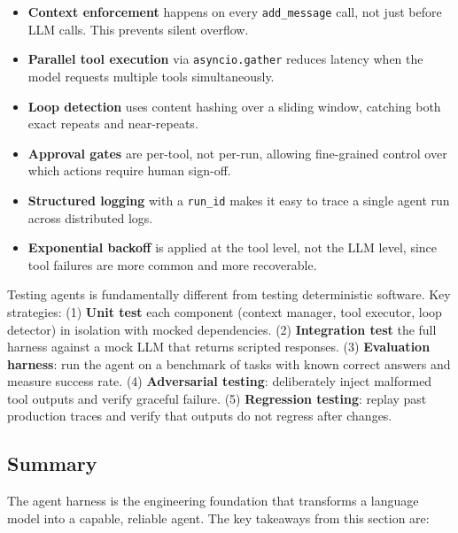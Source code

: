 \begin{examplebox}
\begin{itemize}
  \item \textbf{Context enforcement} happens on every \texttt{add\_message} call, not just before LLM calls. This prevents silent overflow.
  \item \textbf{Parallel tool execution} via \texttt{asyncio.gather} reduces latency when the model requests multiple tools simultaneously.
  \item \textbf{Loop detection} uses content hashing over a sliding window, catching both exact repeats and near-repeats.
  \item \textbf{Approval gates} are per-tool, not per-run, allowing fine-grained control over which actions require human sign-off.
  \item \textbf{Structured logging} with a \texttt{run\_id} makes it easy to trace a single agent run across distributed logs.
  \item \textbf{Exponential backoff} is applied at the tool level, not the LLM level, since tool failures are more common and more recoverable.
\end{itemize}
\end{examplebox}

\begin{questionbox}
Testing agents is fundamentally different from testing deterministic software. Key strategies: (1) \textbf{Unit test} each component (context manager, tool executor, loop detector) in isolation with mocked dependencies. (2) \textbf{Integration test} the full harness against a mock LLM that returns scripted responses. (3) \textbf{Evaluation harness}: run the agent on a benchmark of tasks with known correct answers and measure success rate. (4) \textbf{Adversarial testing}: deliberately inject malformed tool outputs and verify graceful failure. (5) \textbf{Regression testing}: replay past production traces and verify that outputs do not regress after changes.
\end{questionbox}

\subsection*{Summary}
\label{summary}

The agent harness is the engineering foundation that transforms a language model into a capable, reliable agent. The key takeaways from this section are:

